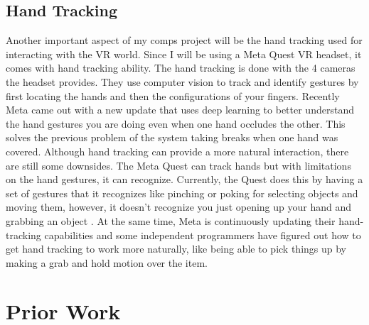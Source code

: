 \documentclass[11pt,twocolumn]{article}
\begin{document}
 
\subsection{Hand Tracking}
Another important aspect of my comps project will be the hand tracking used for interacting with the VR world. Since I will be using a Meta Quest VR headset, it comes with hand tracking ability. The hand tracking is done with the 4 cameras the headset provides. They use computer vision to track and identify gestures by first locating the hands and then the configurations of your fingers\cite{handTracking}. Recently Meta came out with a new update that uses deep learning to better understand the hand gestures you are doing even when one hand occludes the other. This solves the previous problem of the system taking breaks when one hand was covered. Although hand tracking can provide a more natural interaction, there are still some downsides. The Meta Quest can track hands but with limitations on the hand gestures, it can recognize. Currently, the Quest does this by having a set of gestures that it recognizes like pinching or poking for selecting objects and moving them, however, it doesn’t recognize you just opening up your hand and grabbing an object \cite{handTracking}. At the same time, Meta is continuously updating their hand-tracking capabilities and some independent programmers have figured out how to get hand tracking to work more naturally, like being able to pick things up by making a grab and hold motion over the item\cite{handPosing2020}.  





\section{Prior Work}
\end{document}
